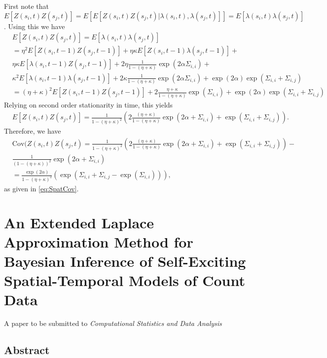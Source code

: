 \documentclass[11pt]{isuthesis}
\begin{document}
First note that $E[Z(s_i,t)Z(s_j,t)]=E[E[Z(s_i,t)Z(s_j,t)|\lambda(s_i,t),\lambda(s_j,t)]]=E[\lambda(s_i,t)\lambda(s_j,t)]$.  Using this we have
\begin{align}
	& E[Z(s_i,t)Z(s_j,t)]=E[\lambda(s_i,t)\lambda(s_j,t)]\\
	& = \eta^2 E[Z(s_i,t-1)Z(s_j,t-1)] + \eta \kappa E[Z(s_i,t-1)\lambda(s_j,t-1)]+\nonumber\\
	& \eta \kappa E[\lambda(s_i,t-1)Z(s_j,t-1)]+2\eta \frac{1}{1-(\eta+\kappa)}\exp(2\alpha \Sigma_{i,i})+\nonumber \\
	&\kappa^2 E[\lambda(s_i,t-1)\lambda(s_j,t-1)]+2 \kappa \frac{1}{1-(\eta+\kappa)}\exp(2\alpha \Sigma_{i,i})+\exp(2\alpha)\exp(\Sigma_{i,i}+\Sigma_{i,j})\\
	& = (\eta+\kappa)^2 E[Z(s_i,t-1)Z(s_j,t-1)]+2\frac{\eta+\kappa}{1-(\eta+\kappa)}\exp(\Sigma_{i,i})+\exp(2\alpha)\exp(\Sigma_{i,i}+\Sigma_{i,j})
\end{align}
Relying on second order stationarity in time, this yields
\begin{align}
	& E[Z(s_i,t)Z(s_j,t)] = \frac{1}{1-(\eta+\kappa)^2}\left(2\frac{(\eta+\kappa)}{1-(\eta+\kappa)}\exp(2\alpha+\Sigma_{i,i})+\exp(\Sigma_{i,i}+\Sigma_{i,j})\right).
\end{align}
Therefore, we have
\begin{align}
	& \mbox{Cov} (Z(s_i,t)Z(s_j,t)=\frac{1}{1-(\eta+\kappa)^2}\left(2\frac{(\eta+\kappa)}{1-(\eta+\kappa)}\exp(2\alpha+\Sigma_{i,i})+\exp(\Sigma_{i,i}+\Sigma_{i,j})\right) -\nonumber\\ & \frac{1}{(1-(\eta+\kappa))^2}\exp(2\alpha + \Sigma_{i,i})\\
	&=\frac{\exp(2\alpha)}{1-(\eta+\kappa)^2}\left(\exp(\Sigma_{i,i}+\Sigma_{i,j}-\exp(\Sigma_{i,i}))\right),
\end{align}
as given in \eqref{eq:SpatCov}.


	\chapter{An Extended Laplace Approximation Method for Bayesian Inference of Self-Exciting Spatial-Temporal Models of Count Data}\label{CSDA}
	\begin{center}
		A paper to be submitted to \textit{Computational Statistics and Data Analysis}
	\end{center}
	\section*{Abstract}
	
\end{document}
